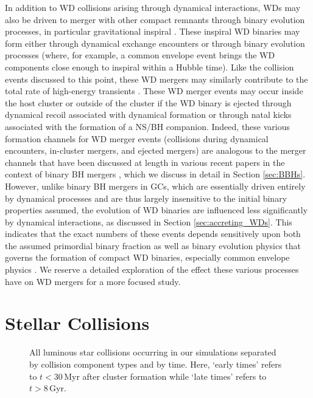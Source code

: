 \documentclass[twocolumn,tighten]{aastex63}
\begin{document}
In addition to WD collisions arising through dynamical interactions, WDs may also be driven to merger with other compact remnants through binary evolution processes, in particular gravitational inspiral \citep[e.g.,][]{Kremer2015,Shen2015}. These inspiral WD binaries may form either through dynamical exchange encounters or through binary evolution processes (where, for example, a common envelope event brings the WD components close enough to inspiral within a Hubble time). Like the collision events discussed to this point, these WD mergers may similarly contribute to the total rate of high-energy transients \citep[e.g.,][]{SharaHurley2002,Shen2019}. These WD merger events may occur inside the host cluster or outside of the cluster if the WD binary is ejected through dynamical recoil associated with dynamical formation or through natal kicks associated with the formation of a NS/BH companion. Indeed, these various formation channels for WD merger events (collisions during dynamical encounters, in-cluster mergers, and ejected mergers) are analogous to the merger channels that have been discussed at length in various recent papers in the context of binary BH mergers \citep[e.g.,][]{Samsing2018a,D'Orazio2018,Rodriguez2018b,Zevin2018,Kremer2019b}, which we discuss in detail in Section \ref{sec:BBHs}. However, unlike binary BH mergers in GCs, which are essentially driven entirely by dynamical processes \citep[primordial BH mergers constitute $\lesssim5\%$ of all mergers;][]{Rodriguez2018a} and are thus largely insensitive to the initial binary properties assumed, the evolution of WD binaries are influenced less significantly by dynamical interactions, as discussed in Section \ref{sec:accreting_WDs}. This indicates that the exact numbers of these events depends sensitively upon both the assumed primordial binary fraction as well as binary evolution physics that governs the formation of compact WD binaries, especially common envelope physics \citep[e.g.,][]{SharaHurley2002}. We reserve a detailed exploration of the effect these various processes have on WD mergers for a more focused study.

\section{Stellar Collisions}
\label{sec:stellar_collisions}

\begin{figure*}
\begin{center}
\caption{\footnotesize All luminous star collisions occurring in our simulations separated by collision component types and by time. Here, `early times' refers to $t<30\,$Myr after cluster formation while `late times' refers to $t>8\,$Gyr.}
\label{fig:stellar_collisions}
\end{center}
\end{figure*}
\end{document}
